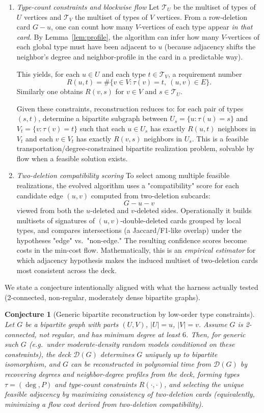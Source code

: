 \documentclass[11pt]{amsart}
\newtheorem{conjecture}{Conjecture}
\begin{document}
\begin{enumerate}
\item \emph{Type-count constraints and blockwise flow}
Let $\mathcal{T}_U$ be the multiset of types of $U$ vertices and $\mathcal{T}_V$ the multiset of types of $V$ vertices.
From a row-deletion card $G-u$, one can count how many $V$-vertices of each type appear \emph{in that card}.
By Lemma~\ref{lem:profile}, the algorithm can infer how many $V$-vertices of each global type must have been adjacent to $u$ (because adjacency shifts the neighbor's degree and neighbor-profile in the card in a predictable way).

This yields, for each $u\in U$ and each type $t\in \mathcal{T}_V$, a requirement number
\[
R(u,t) = \#\{ v\in V : \tau(v)=t,\ (u,v)\in E\}.
\]
Similarly one obtains $R(v,s)$ for $v\in V$ and $s\in\mathcal{T}_U$.

Given these constraints, reconstruction reduces to: for each pair of types $(s,t)$, determine a bipartite subgraph between $U_s=\{u:\tau(u)=s\}$ and $V_t=\{v:\tau(v)=t\}$ such that each $u\in U_s$ has exactly $R(u,t)$ neighbors in $V_t$ and each $v\in V_t$ has exactly $R(v,s)$ neighbors in $U_s$.
This is a feasible transportation/degree-constrained bipartite realization problem, solvable by flow when a feasible solution exists.

\item \emph{Two-deletion compatibility scoring}
To select among multiple feasible realizations, the evolved algorithm uses a "compatibility" score for each candidate edge $(u,v)$ computed from two-deletion subcards:
\[
G-u-v
\]
viewed from both the $u$-deleted and $v$-deleted sides.
Operationally it builds multisets of signatures of $(u,v)$-double-deleted cards grouped by local types, and compares intersections (a Jaccard/F1-like overlap) under the hypotheses "edge" vs.\ "non-edge." The resulting confidence scores become costs in the min-cost flow.
Mathematically, this is an \emph{empirical estimator} for which adjacency hypothesis makes the induced multiset of two-deletion cards most consistent across the deck.
\end{enumerate}
We state a conjecture intentionally aligned with what the harness actually tested (2-connected, non-regular, moderately dense bipartite graphs).

\begin{conjecture}[Generic bipartite reconstruction by low-order type constraints]\label{conj:bipartite}
Let $G$ be a bipartite graph with parts $(U,V)$, $|U|=u$, $|V|=v$.
Assume $G$ is 2-connected, not regular, and has minimum degree at least $6$.
Then, for generic such $G$ (e.g.\ under moderate-density random models conditioned on these constraints), the deck $\mathcal{D}(G)$ determines $G$ uniquely up to bipartite isomorphism, and $G$ can be reconstructed in polynomial time from $\mathcal{D}(G)$ by recovering degrees and neighbor-degree profiles from the deck, forming types $\tau=(\deg,P)$ and type-count constraints $R(\cdot,\cdot)$, and selecting the unique feasible adjacency by maximizing consistency of two-deletion cards (equivalently, minimizing a flow cost derived from two-deletion compatibility).
\end{conjecture}
\end{document}
